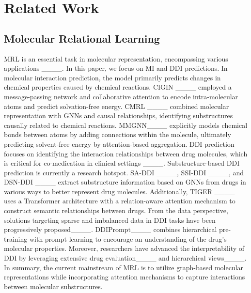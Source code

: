 \section{Related Work}
\subsection{Molecular Relational Learning}
MRL is an essential task in molecular representation, encompassing various applications ____. 
In this paper, we focus on MI and DDI predictions. 
In molecular interaction prediction, the model primarily predicts changes in chemical properties caused by chemical reactions. CIGIN ____ employed a message-passing network and collaborative attention to encode intra-molecular atoms and predict solvation-free energy. 
CMRL ____ combined molecular representation with GNNs and causal relationships, identifying substructures causally related to chemical reactions. MMGNN____ explicitly models chemical bonds between atoms by adding connections within the molecule, ultimately predicting solvent-free energy by attention-based aggregation.
DDI prediction focuses on identifying the interaction relationships between drug molecules, which is critical for co-medication in clinical settings ____. 
Substructure-based DDI prediction is currently a research hotspot. 
SA-DDI ____, SSI-DDI ____, and DSN-DDI ____ extract substructure information based on GNNs from drugs in various ways to better represent drug molecules. Additionally, TIGER ____ uses a Transformer architecture with a relation-aware attention mechanism to construct semantic relationships between drugs. From the data perspective, solutions targeting sparse and imbalanced data in DDI tasks have been progressively proposed____. DDIPrompt____ combines hierarchical pre-training with prompt learning to encourage an understanding of the drug's molecular properties. Moreover, researchers have advanced the interpretability of DDI by leveraging extensive drug evaluation____ and hierarchical views____. In summary, the current mainstream of MRL is to utilize graph-based molecular representations while incorporating attention mechanisms to capture interactions between molecular substructures.

